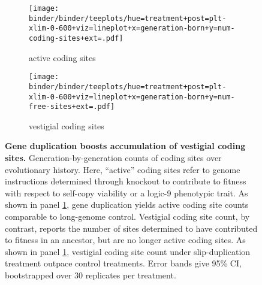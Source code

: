 \begin{figure}
    \centering
    \begin{subfigure}{\linewidth}
    \texttt{[image: binder/binder/teeplots/hue=treatment+post=plt-xlim-0-600+viz=lineplot+x=generation-born+y=num-coding-sites+ext=.pdf]}
    \caption{\footnotesize active coding sites}
    \label{fig:num-coding-sites:active}
    \end{subfigure}

    \begin{subfigure}{\linewidth}
\texttt{[image: binder/binder/teeplots/hue=treatment+post=plt-xlim-0-600+viz=lineplot+x=generation-born+y=num-free-sites+ext=.pdf]}
    \caption{\footnotesize vestigial coding sites}
    \label{fig:num-coding-sites:vestigial}
    \end{subfigure}
    \caption{
        \textbf{Gene duplication boosts accumulation of vestigial coding sites.}
        \footnotesize
        Generation-by-generation counts of coding sites over evolutionary history.
        Here, ``active'' coding sites refer to genome instructions determined through knockout to contribute to fitness with respect to self-copy viability or a logic-9 phenotypic trait.
        As shown in panel \ref{fig:num-coding-sites:active}, gene duplication yields active coding site counts comparable to long-genome control.
        Vestigial coding site count, by contrast, reports the number of sites determined to have contributed to fitness in an ancestor, but are no longer active coding sites.
        As shown in panel \ref{fig:num-coding-sites:active}, vestigial coding site count under slip-duplication treatment outpace control treatments.
        Error bands give 95\% CI, bootstrapped over 30 replicates per treatment.
    }
    \label{fig:num-coding-sites}
\end{figure}
